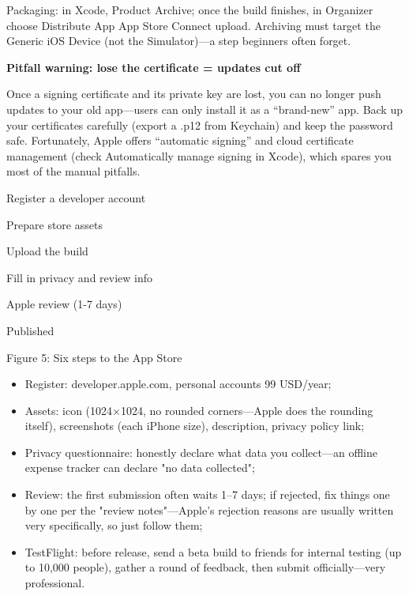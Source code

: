 Packaging: in Xcode, Product Archive; once the build finishes, in Organizer choose Distribute App App Store Connect upload. Archiving must target the Generic iOS Device (not the Simulator)—a step beginners often forget.

\textbf{Pitfall warning: lose the certificate = updates cut off}\par

Once a signing certificate and its private key are lost, you can no longer push updates to your old app—users can only install it as a “brand-new” app. Back up your certificates carefully (export a .p12 from Keychain) and keep the password safe. Fortunately, Apple offers “automatic signing” and cloud certificate management (check Automatically manage signing in Xcode), which spares you most of the manual pitfalls.


Register a developer account

Prepare store assets

Upload the build

Fill in privacy and review info

Apple review (1-7 days)

Published

\begin{center}\small\color{gray}Figure 5: Six steps to the App Store\end{center}

\begin{itemize}
  \item Register: developer.apple.com, personal accounts 99 USD/year;
  \item Assets: icon (1024×1024, no rounded corners—Apple does the rounding itself), screenshots (each iPhone size), description, privacy policy link;
  \item Privacy questionnaire: honestly declare what data you collect—an offline expense tracker can declare "no data collected";
  \item Review: the first submission often waits 1–7 days; if rejected, fix things one by one per the "review notes"—Apple's rejection reasons are usually written very specifically, so just follow them;
  \item TestFlight: before release, send a beta build to friends for internal testing (up to 10,000 people), gather a round of feedback, then submit officially—very professional.
\end{itemize}

